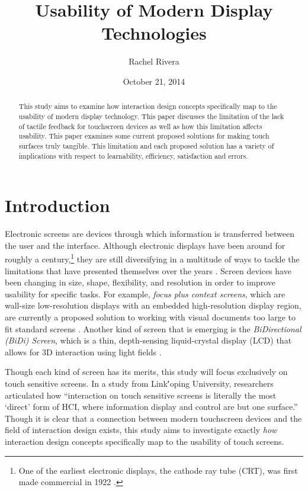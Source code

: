 \documentclass[11pt]{article}
\title{Usability of Modern Display Technologies}
\author{Rachel Rivera}
\date{October 21, 2014}
\begin{document}
\maketitle


\begin{abstract} %
This study aims to examine how interaction design concepts specifically map to the usability of modern display technology. This paper discusses the limitation of the lack of tactile feedback for touchscreen devices as well as how this limitation affects usability. This paper examines some current proposed solutions for making touch surfaces truly tangible. This limitation and each proposed solution has a variety of implications with respect to learnability, efficiency, satisfaction and errors. 
\end{abstract}


\pagebreak
\tableofcontents



\pagebreak


\section{Introduction}
\label{introduction}

Electronic screens are devices through which information is transferred between the user and the interface. Although electronic displays have been around for roughly a century,\footnote{One of the earliest electronic displays, the cathode ray tube (CRT),  was first made commercial in 1922 \cite{Cathode}.} they are still diversifying in a multitude of ways to tackle the limitations that have presented themselves over the years \cite{Eisenberg}. Screen devices have been changing in size, shape, flexibility, and resolution in order to improve usability for specific tasks. For example, \textit{focus plus context screens}, which are wall-size low-resolution displays with an embedded high-resolution display region, are currently a proposed solution to working with visual documents too large to fit standard screens \cite{Baudisch}. Another kind of screen that is emerging is the \textit{BiDirectional (BiDi) Screen}, which is a thin, depth-sensing liquid-crystal display (LCD) that allows for 3D interaction using light fields \cite{Hirsch}.

 Though each kind of screen has its merits, this study will focus exclusively on touch sensitive screens. In a study from Link\''{o}ping University, researchers articulated how ``interaction on touch sensitive screens is literally the most `direct' form of HCI, where information display and control are but one surface.''\cite{Albinsson} Though it is clear that a connection between modern touchscreen devices and the field of interaction design exists, this study aims to investigate exactly \textit{how} interaction design concepts specifically map to the usability of touch screens. 
\end{document}
